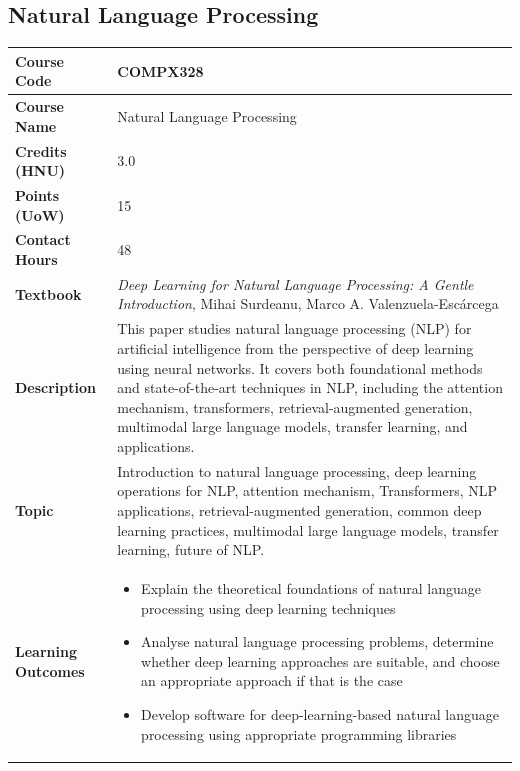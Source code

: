\documentclass{article}
\begin{document}
\subsection[COMPX328 Natural Language Processing]{Natural Language Processing}
\renewcommand{\arraystretch}{1.5} %
\begin{longtable}{|p{3cm}|p{10cm}|}
\hline
\textbf{Course Code} & COMPX328 \\
\hline
\textbf{Course Name} & Natural Language Processing \\
\hline
\textbf{Credits (HNU)} & 3.0 \\
\hline
\textbf{Points (UoW)} & 15 \\
\hline
\textbf{Contact Hours} & 48 \\
\hline
\textbf{Textbook} & \emph{Deep Learning for Natural Language Processing: A Gentle Introduction}, Mihai Surdeanu, Marco A. Valenzuela-Escárcega \\
\hline
\textbf{Description} & This paper studies natural language processing (NLP) for artificial intelligence from the perspective of deep learning using neural networks. It covers both foundational methods and state-of-the-art techniques in NLP, including the attention mechanism, transformers, retrieval-augmented generation, multimodal large language models, transfer learning, and applications.\\
\hline
\textbf{Topic} &Introduction to natural language processing, 
deep learning operations for NLP, 
attention mechanism, 
Transformers, 
NLP applications, 
retrieval-augmented generation, 
common deep learning practices, 
multimodal large language models, 
transfer learning, 
future of NLP.\\
\hline
\textbf{Learning Outcomes} & 
    \begin{itemize}
        \item Explain the theoretical foundations of natural language processing using deep learning techniques
        \item Analyse natural language processing problems, determine whether deep learning approaches are suitable, and choose an appropriate approach if that is the case
        \item Develop software for deep-learning-based natural language processing using appropriate programming libraries
    \end{itemize} \\
\hline
\end{longtable}
\end{document}
